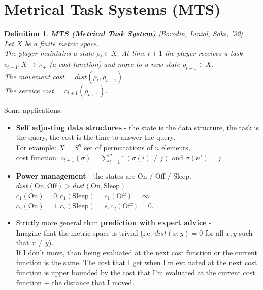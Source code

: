 \documentclass[11pt]{book} %
\newtheorem{definition}{Definition}[section]
\begin{document}
\section{Metrical Task Systems (MTS)}

\begin{definition}{\textbf{MTS (Metrical Task System)} [Borodin, Linial, Saks, '92]} \\
    Let $X$ be a finite metric space. \\
    The player maintains a state $\rho _t \in X$. 
    At time $t+1$ the player receives a task $c_{t+1} : X \to \mathbb{R}_+$ (a cost function) and move to a new state $\rho_{t+1} \in X$. \\
    The movement cost = $dist(\rho_t, \rho_{t+1})$. \\
    The service cost = $c_{t+1}(\rho_{t+1})$.
\end{definition}

Some applications:
\begin{itemize}
    \item \textbf{Self adjusting data structures} - the state is the data structure, the task is the query, the cost is the time to answer the query. \\
    For example: $X = S^n$ set of permutations of $n$ elements, \\
    cost function: $c_{t+1}(\sigma) = \sum_{i=1}^{n'} \mathds{1} (\sigma(i) \neq j)$ and $\sigma(n') = j$ 

    \item \textbf{Power management} - the states are On $/$ Off $/$ Sleep. \\
            $dist(\text{On}, \text{Off}) > dist(\text{On}, \text{Sleep})$. \\
            $c_1(\text{On}) = 0, c_1(\text{Sleep}) = c_1(\text{Off}) = \infty$. \\
            $c_2(\text{On}) = 1, c_2(\text{Sleep}) = \epsilon, c_2(\text{Off}) = 0$. 

    \item Strictly more general than \textbf{prediction with expert advice} - \\
        Imagine that the metric space is trivial (i.e. $dist(x, y) = 0$ for all $x, y$ such that $x \neq y$). \\
        If I don't move, than being evaluated at the next cost function or the current function is the same. 
        The cost that I get when I'm evaluated at the next cost function is upper bounded by the cost that I'm evaluated at the current cost function 
        $+$ the distance that I moved.
\end{itemize}
\end{document}
